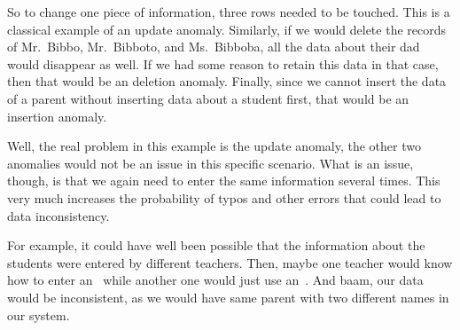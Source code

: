 So to change one piece of information, three rows needed to be touched.
This is a classical example of an update anomaly.
Similarly, if we would delete the records of Mr.~Bibbo, Mr.~Bibboto, and Ms.~Bibboba, all the data about their dad would disappear as well.
If we had some reason to retain this data in that case, then that would be an deletion anomaly.
Finally, since we cannot insert the data of a parent without inserting data about a student first, that would be an insertion anomaly.

Well, the real problem in this example is the update anomaly, the other two anomalies would not be an issue in this specific scenario.
What is an issue, though, is that we again need to enter the same information several times.
This very much increases the probability of typos and other errors that could lead to data inconsistency.

For example, it could have well been possible that the information about the students were entered by different teachers.
Then, maybe one teacher would know how to enter an~ while another one would just use an~.
And baam, our data would be inconsistent, as we would have same parent with two different names in our system.%
%
\FloatBarrier%
\endhsection%
%
